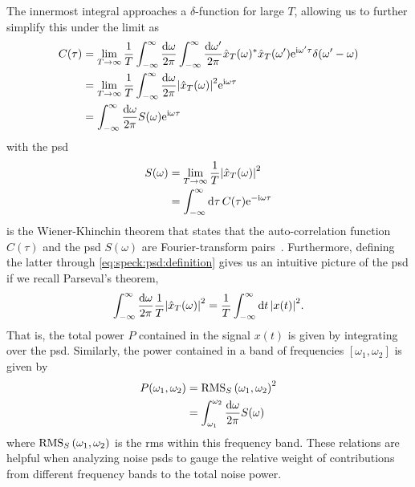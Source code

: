 The innermost integral approaches a $\delta$-function for large $T$,
allowing us to further simplify this under the limit as
\begin{align}
    C(\tau) &= \lim_{T\to\infty} \frac{1}{T}\int_{-\infty}^{\infty}\frac{\dd{\omega}}{2\pi}\int_{-\infty}^{\infty}\frac{\dd{\omega^\prime}}{2\pi}
                \hat{x}_T(\omega)^\ast\hat{x}_T(\omega^\prime)
                \mathrm{e}^{\mathrm{i}\omega^\prime\tau}\delta(\omega^\prime - \omega)\\
            &= \lim_{T\to\infty}\frac{1}{T}
                \int_{-\infty}^{\infty}\frac{\dd{\omega}}{2\pi}\abs{\hat{x}_T(\omega)}^2 \mathrm{e}^{\mathrm{i}\omega\tau} \\
            &= \int_{-\infty}^{\infty}\frac{\dd{\omega}}{2\pi} S(\omega) \mathrm{e}^{\mathrm{i}\omega\tau} \label{eq:speck:wiener_khinchin}
\end{align}
with the \gls{psd}
\begin{align}
    S(\omega) &= \lim_{T\to\infty}\frac{1}{T}\abs{\hat{x}_T(\omega)}^2 \label{eq:speck:psd:definition}\\
              &= \int_{-\infty}^{\infty}\dd{\tau} C(\tau)\mathrm{e}^{-\mathrm{i}\omega\tau}
\end{align}
 is the Wiener-Khinchin theorem that states that the auto-correlation function $C(\tau)$ and the \gls{psd} $S(\omega)$ are Fourier-transform pairs~\cite{Koopmans1995}.
Furthermore, defining the latter through \cref{eq:speck:psd:definition} gives us an intuitive picture of the \gls{psd} if we recall Parseval's theorem,
\begin{align}\label{eq:speck:parseval}
    \int_{-\infty}^{\infty}\frac{\dd{\omega}}{2\pi}\frac{1}{T}\abs{\hat{x}_T(\omega)}^2 = \frac{1}{T}\int_{-\infty}^{\infty}\dd{t}\abs{x(t)}^2.
\end{align}
That is, the total power $P$ contained in the signal $x(t)$ is given by integrating over the \gls{psd}.
Similarly, the power contained in a band of frequencies $[\omega_1, \omega_2]$ is given by
\begin{align}
    P(\omega_1, \omega_2) &= \operatorname{RMS}_S\left(\omega_1, \omega_2\right)^2 \label{eq:speck:psd:bandpower}\\
                          &= \int_{\omega_1}^{\omega_2}\frac{\dd{\omega}}{2\pi} S(\omega)
\end{align}
where $\operatorname{RMS}_S\left(\omega_1, \omega_2\right)$ is the \acrlong{rms} within this frequency band.
These relations are helpful when analyzing noise \glspl{psd} to gauge the relative weight of contributions from different frequency bands to the total noise power.


